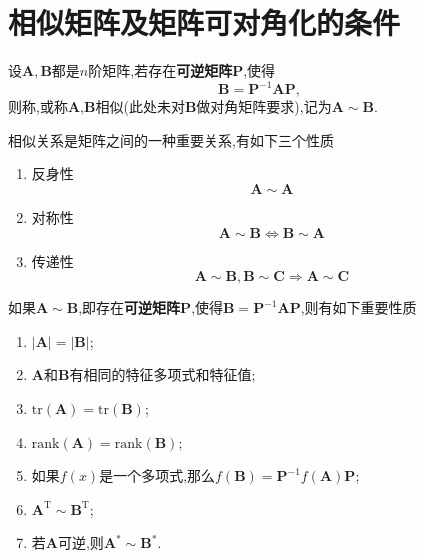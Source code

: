 \documentclass[9pt,a4paper]{book}
\begin{document}
\section{相似矩阵及矩阵可对角化的条件}
\begin{defination}[相似矩阵的定义]\label{juzhenxiangshi}
	设$ \bm{A},\bm{B} $都是$ n $阶矩阵,若存在\textbf{可逆矩阵}$ \bm{P} $,使得
	\[
	\bm{B}=\bm{P}^{-1}\bm{A}\bm{P},
	\]
	则称,或称$ \bm{A}$,$ \bm{B}$相似(此处未对$ \bm{B} $做对角矩阵要求),记为$ \bm{A}\sim\bm{B} $.
\end{defination}
\begin{theorem}[相似矩阵的关系]
	相似关系是矩阵之间的一种重要关系,有如下三个性质
	\begin{enumerate}
		\item 反身性\[\bm{A}\sim\bm{A}\]
		\item 对称性\[\bm{A}\sim\bm{B}\Leftrightarrow\bm{B}\sim\bm{A}\]
		\item 传递性\[\bm{A}\sim\bm{B},\bm{B}\sim\bm{C}\Rightarrow\bm{A}\sim\bm{C}\]
	\end{enumerate}
\end{theorem}
\begin{feature}[矩阵相似的性质]
	如果$ \bm{A}\sim\bm{B} $,即存在\textbf{可逆矩阵}$ \bm{P} $,使得$ \bm{B}=\bm{P}^{-1}\bm{A}\bm{P} $,则有如下重要性质
	\begin{enumerate}
		\item $ |\bm{A}|=|\bm{B}| $;
		\item $ \bm{A} $和$ \bm{B} $有相同的特征多项式和特征值;
		\item $ \mathrm{tr}(\bm{A})=\mathrm{tr}(\bm{B}) $;
		\item $ \mathrm{rank}(\bm{A})=\mathrm{rank}(\bm{B}) $;
		\item 如果$ f(x) $是一个多项式,那么$ f(\bm{B})=\bm{P}^{-1}f(\bm{A})\bm{P} $;
		\item $ \bm{A}^{\mathrm{T}}\sim\bm{B}^{\mathrm{T}} $;
		\item 若$ \bm{A} $可逆,则$ \bm{A}^*\sim\bm{B}^* $.
	\end{enumerate}
\end{feature}
\end{document}
